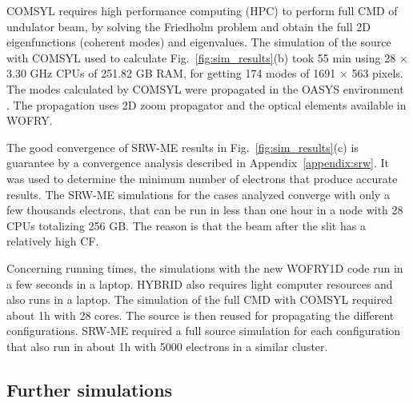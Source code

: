 \documentclass{iucr}              %
\begin{document}
COMSYL requires high performance computing (HPC) to perform full CMD of undulator beam, by
solving the Friedholm problem and obtain the full 2D eigenfunctions (coherent modes) and eigenvalues.
The simulation of the source with COMSYL used to calculate Fig.~\ref{fig:sim_results}(b) took 55 min using 28 $\times$ 3.30 GHz CPUs of 251.82 GB RAM, for getting 174 modes of 1691 $\times$ 563 pixels. The modes calculated by COMSYL were propagated in the OASYS environment \cite{codeOASYS}. The propagation uses 2D zoom propagator and the optical elements available in WOFRY. 

The good convergence of SRW-ME results in Fig.~\ref{fig:sim_results}(c) is guarantee by a convergence analysis described in Appendix~\ref{appendix:srw}. It was used to determine the minimum number of electrons that produce accurate results. The SRW-ME simulations for the cases analyzed converge with only a few thousands electrons, that can be run in less than one hour in a node with 28 CPUs totalizing 256 GB. The reason is that the beam after the slit has a relatively high CF. 

Concerning running times, the simulations with the new WOFRY1D code run in a few seconds in a laptop.
HYBRID also requires light computer resources and also runs in a laptop. 
The simulation of the full CMD with COMSYL required about 1h with 28 cores. The source is then reused for propagating the different configurations. SRW-ME required a full source simulation for each configuration that also run in about 1h with 5000 electrons in a similar cluster. 


\subsection{Further simulations}
\label{sec:discussion}

\end{document}
